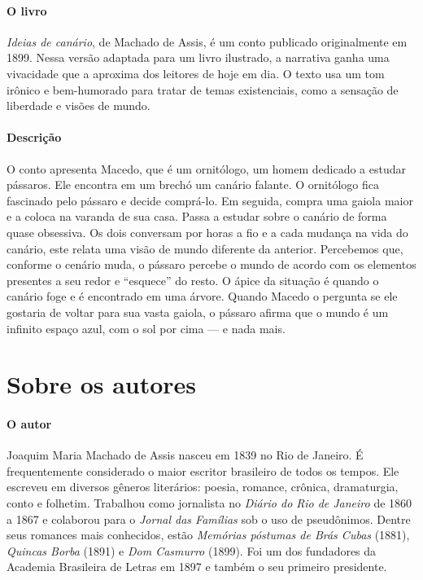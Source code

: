 \documentclass[11pt]{extarticle}
\begin{document}
\paragraph{O livro} \textit{Ideias de canário}, de Machado de Assis, é um conto publicado originalmente em 1899. Nessa versão adaptada para um livro ilustrado, a narrativa ganha uma vivacidade que a aproxima dos leitores de hoje em dia. O texto usa um tom irônico e bem-humorado para tratar de temas existenciais, como a sensação de liberdade e visões de mundo.

\paragraph{Descrição} O conto apresenta Macedo, que é um ornitólogo, um homem dedicado a estudar pássaros. Ele encontra em um brechó um canário falante. O ornitólogo fica fascinado pelo pássaro e decide comprá-lo. Em seguida, compra uma gaiola maior e a coloca na varanda de sua casa. Passa a estudar sobre o canário de forma quase obsessiva. Os dois conversam por horas a fio e a cada mudança na vida do canário, este relata uma visão de mundo diferente da anterior. Percebemos que, conforme o cenário muda, o pássaro percebe o mundo de acordo com os elementos presentes a seu redor e ``esquece'' do resto. O ápice da situação é quando o canário foge e é encontrado em uma árvore. Quando Macedo o pergunta se ele gostaria de voltar para sua vasta gaiola, o pássaro afirma que o mundo é um infinito espaço azul, com o sol por cima --- e nada mais.


\section{Sobre os autores}

\paragraph{O autor} Joaquim Maria Machado de Assis nasceu em 1839 no Rio de Janeiro. É frequentemente considerado o maior escritor
brasileiro de todos os tempos. Ele escreveu em diversos gêneros literários: poesia, romance, crônica, dramaturgia, conto e folhetim. Trabalhou como jornalista no \textit{Diário do Rio de Janeiro} de 1860 a 1867 e colaborou para o \textit{Jornal das Famílias} sob o uso de pseudônimos. Dentre seus romances mais conhecidos, estão \textit{Memórias póstumas de Brás Cubas} (1881), \textit{Quincas Borba} (1891) e \textit{Dom Casmurro} (1899). Foi um dos fundadores da Academia Brasileira de Letras em 1897 e também o seu primeiro presidente.
\end{document}
